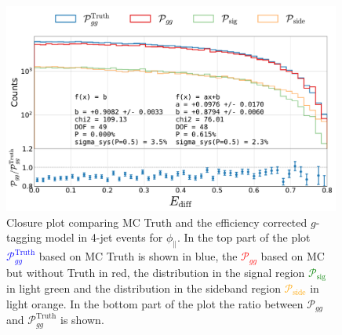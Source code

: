 \begin{figure}
  \centerfloat
  \includegraphics[width=0.99\textwidth, trim=10 0 20 5, clip, page=6]{figures/quarks/gtag-closure_test-down_sample=1.00-ML_vars=vertex-selection=b-ejet_min=4-n_iter_RS_lgb=99-n_iter_RS_xgb=9-cdot_cut=0.90-version=19-njet=4.pdf}
  \caption[Closure Plot Comparing MC Truth and the Efficiency Corrected $g$-Tagging Model in 4-Jet Events for $\phi_\mathrm{\parallel}$]
          {Closure plot comparing MC Truth and the efficiency corrected $g$-tagging model in 4-jet events for $\phi_\mathrm{\parallel}$. In the top part of the plot \textcolor{blue}{$\mathcal{P}_{gg}^\mathrm{Truth}$} based on MC Truth is shown in blue, the \textcolor{red}{$\mathcal{P}_{gg}$} based on MC but without Truth in red, the distribution in the signal region \textcolor{green}{$\mathcal{P}_{\mathrm{sig}}$} in light green and the distribution in the sideband region \textcolor{orange}{$\mathcal{P}_{\mathrm{side}}$} in light orange. In the bottom part of the plot the ratio between $\mathcal{P}_{gg}$ and $\mathcal{P}_{gg}^\mathrm{Truth}$  is shown. } 
  \label{fig:q:closure_phi_planes}
\end{figure}
